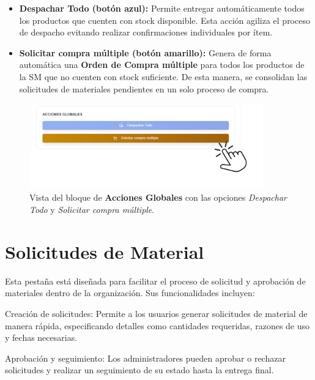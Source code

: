 \begin{itemize}
    \item \textbf{Despachar Todo (botón azul):} Permite entregar automáticamente todos los productos que cuenten con stock disponible.  
    Esta acción agiliza el proceso de despacho evitando realizar confirmaciones individuales por ítem.
    
    \item \textbf{Solicitar compra múltiple (botón amarillo):} Genera de forma automática una \textbf{Orden de Compra múltiple} para todos los productos de la SM que no cuenten con stock suficiente.  
    De esta manera, se consolidan las solicitudes de materiales pendientes en un solo proceso de compra.
\end{itemize}

\begin{figure}[H]
    \centering
    \includegraphics[width=0.9\textwidth]{imgs/Almacen_General/Procesamiento_SM/acciones-globales.png}
    \caption{Vista del bloque de \textbf{Acciones Globales} con las opciones \textit{Despachar Todo} y \textit{Solicitar compra múltiple}.}
    \label{fig:acciones_globales}
\end{figure}







\section{Solicitudes de Material}

Esta pestaña está diseñada para facilitar el proceso de solicitud y aprobación de materiales dentro de la organización. Sus funcionalidades incluyen: 

Creación de solicitudes: Permite a los usuarios generar solicitudes de material de manera rápida, especificando detalles como cantidades requeridas, razones de uso y fechas necesarias. 

Aprobación y seguimiento: Los administradores pueden aprobar o rechazar solicitudes y realizar un seguimiento de su estado hasta la entrega final. 

